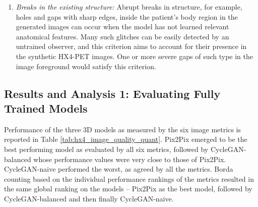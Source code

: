 \begin{enumerate}
    \item \textit{Breaks in the existing structure:} Abrupt breaks in structure, for example, holes and gaps with sharp edges, inside the patient's body region in the generated images can occur when the model has not learned relevant anatomical features. Many such glitches can be easily detected by an untrained observer, and this criterion aims to account for their presence in the synthetic HX4-PET images. One or more severe gaps of such type in the image foreground would satisfy this criterion.
\end{enumerate}



\subsection{Results and Analysis 1: Evaluating Fully Trained Models}
Performance of the three 3D models as measured by the six image metrics is reported in Table \ref{tab:hx4_image_quality_quant}. Pix2Pix emerged to be the best performing model as evaluated by all six metrics, followed by CycleGAN-balanced whose performance values were very close to those of Pix2Pix. CycleGAN-naive performed the worst, as agreed by all the metrics. Borda counting based on the individual performance rankings of the metrics resulted in the same global ranking on the models -- Pix2Pix as the best model, followed by CycleGAN-balanced and then finally CycleGAN-naive.

\begin{table}[h!]
    \scriptsize
    \centering
    \caption{Performance on the Maastro Lung HX4-PET validation set. Best and second-to-best values are highlighted with bold and italics font, respectively. Pix2Pix was the best performing model as agreed by all six metrics. Performance of the unpaired CycleGAN-balanced model reached close to that of the paired Pix2Pix model.}
    \label{tab:hx4_image_quality_quant}
\end{table}

